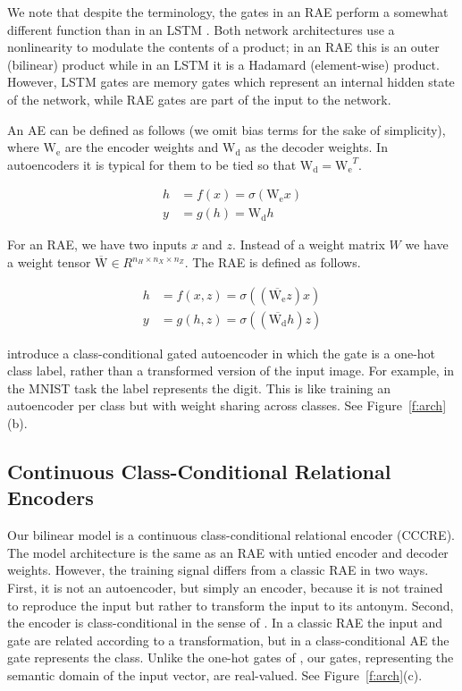 \documentclass[11pt]{article}
\begin{document}
We note that despite the terminology, the gates in an RAE perform a somewhat different function than in an LSTM \citep{lstm}. Both network architectures use a nonlinearity to modulate the contents of a product; in an RAE this is an outer (bilinear) product while in an LSTM it is a Hadamard (element-wise) product. However, LSTM gates are memory gates which represent an internal hidden state of the network, while RAE gates are part of the input to the network.

An AE can be defined as follows (we omit bias terms for the sake of simplicity), where $\mathrm{W_e}$ are the encoder weights and $\mathrm{W_d}$ as the decoder weights. In autoencoders it is typical for them to be tied so that $\mathrm{W_d} = \mathrm{W_e}^T$.

\begin{equation}
\begin{split}
h & = f(x) = \sigma (\mathrm{W_e}x ) \\
y & = g(h) = \mathrm{W_d}h
\end{split}
\end{equation}

For an RAE, we have two inputs $x$ and $z$. Instead of a weight matrix $W$ we have a weight tensor $\overline{\mathrm{W}} \in R^{n_H \times n_X \times n_Z}$.  The RAE is defined as follows.

\begin{equation}
\begin{split}
h & = f(x, z) = \sigma ((\overline{\mathrm{W_e}}z)x) \\
y & = g(h, z) = \sigma ((\overline{\mathrm{W_d}}h)z)
\end{split}
\end{equation}

\citet{rudy:15} introduce a class-conditional gated autoencoder in which the gate is a one-hot class label, rather than a transformed version of the input image. For example, in the MNIST task the label represents the digit. This is like training an autoencoder per class but with weight sharing across classes. See Figure~\ref{f:arch}(b).

\subsection{Continuous Class-Conditional Relational Encoders}

Our bilinear model is a continuous class-conditional relational encoder (CCCRE). The model architecture is the same as an RAE with untied encoder and decoder weights. However, the training signal differs from a classic RAE in two ways. First, it is not an autoencoder, but simply an encoder, because it is not trained to reproduce the input but rather to transform the input to its antonym. Second, the encoder is class-conditional in the sense of \cite{rudy:15}. In a classic RAE the input and gate are related according to a transformation, but in a class-conditional AE the gate represents the class. Unlike the one-hot gates of \cite{rudy:15}, our gates, representing the semantic domain of the input vector, are real-valued. See Figure~\ref{f:arch}(c).
\end{document}
